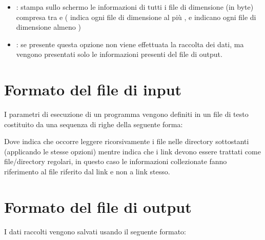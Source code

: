 \documentclass[letterpaper,10pt,italian,openany,oneside]{sphinxmanual}
\begin{document}
\begin{itemize}
\item {} 
: stampa sullo schermo le informazioni di tutti i file di dimensione (in byte) compresa tra  e  ( indica ogni file di dimensione al più ,  e  indicano ogni file di dimensione almeno )

\item {} 
: se presente questa opzione non viene effettuata la raccolta dei dati, ma vengono presentati solo le informazioni presenti del file di output.

\end{itemize}


\section{Formato del file di input}
\label{\detokenize{introduzione:formato-del-file-di-input}}
I parametri di esecuzione di un programma vengono definiti in un file di testo costituito da una sequenza di righe della seguente forma:

\begin{sphinxVerbatim}[commandchars=\\\{\}]
 \PYG{p}{[}\PYG{p}{]} \PYG{p}{[}\PYG{p}{]}
\end{sphinxVerbatim}

Dove  indica che occorre leggere ricorsivamente i file nelle directory sottostanti (applicando le stesse opzioni) mentre  indica che i link devono essere trattati come file/directory regolari, in questo caso le informazioni collezionate fanno riferimento al file riferito dal link e non a link stesso.


\section{Formato del file di output}
\label{\detokenize{introduzione:formato-del-file-di-output}}
I dati raccolti vengono salvati usando il seguente formato:
\end{document}
